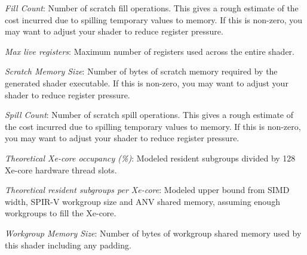 \noindent\textit{Fill Count}: Number of scratch fill operations.  This gives a rough estimate of the cost incurred due to spilling temporary values to memory.  If this is non-zero, you may want to adjust your shader to reduce register pressure.\par
\noindent\textit{Max live registers}: Maximum number of registers used across the entire shader.\par
\noindent\textit{Scratch Memory Size}: Number of bytes of scratch memory required by the generated shader executable.  If this is non-zero, you may want to adjust your shader to reduce register pressure.\par
\noindent\textit{Spill Count}: Number of scratch spill operations.  This gives a rough estimate of the cost incurred due to spilling temporary values to memory.  If this is non-zero, you may want to adjust your shader to reduce register pressure.\par
\noindent\textit{Theoretical Xe-core occupancy (\%)}: Modeled resident subgroups divided by 128 Xe-core hardware thread slots.\par
\noindent\textit{Theoretical resident subgroups per Xe-core}: Modeled upper bound from SIMD width, SPIR-V workgroup size and ANV shared memory, assuming enough workgroups to fill the Xe-core.\par
\noindent\textit{Workgroup Memory Size}: Number of bytes of workgroup shared memory used by this shader including any padding.\par
